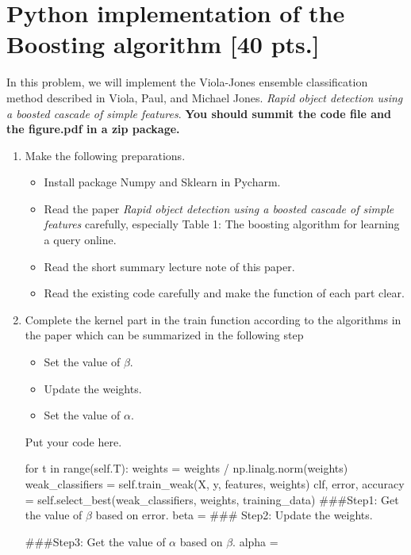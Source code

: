 \documentclass[12pt,letterpaper]{article}
\theoremstyle{definition}
\begin{document}
\section{Python implementation of the Boosting algorithm [40 pts.]}
\vspace{-2ex}

In this problem, we will implement the Viola-Jones ensemble classification method described in 
Viola, Paul, and Michael Jones. \textit{Rapid object detection using a boosted cascade of simple features}.
\textbf{You should summit the code file and the figure.pdf in a zip package.}
 
 \begin{enumerate}[label=(\alph*)]
    \item Make the following preparations.
    \begin{itemize}
        \item Install package Numpy and Sklearn in Pycharm.
        \item Read the paper \textit{Rapid object detection using a boosted cascade of simple features} carefully, especially Table 1: The boosting algorithm for learning a query online.
        \item Read the short summary lecture note of this paper. 
        \item Read the existing code carefully and make the function of each part clear.
    \end{itemize}
    \item Complete the kernel part in the train function according to the algorithms in the paper which can be summarized in the following step
    \begin{itemize}
        \item Set the value of $\beta$.
\item Update the weights.
\item Set the value of $\alpha$.

        
    \end{itemize}
    Put your code here.
    \begin{python}
        for t in range(self.T):
            weights = weights / np.linalg.norm(weights)
            weak_classifiers = self.train_weak(X, y, features, weights)
            clf, error, accuracy = self.select_best(weak_classifiers, weights, training_data)
            ###Step1: Get the value of $\beta$ based on error.
            beta =
            ### Step2: Update the weights.
            
            ###Step3: Get the value of $\alpha$ based on $\beta$.
            alpha = 
            

\end{python}
\end{enumerate}
\end{document}
